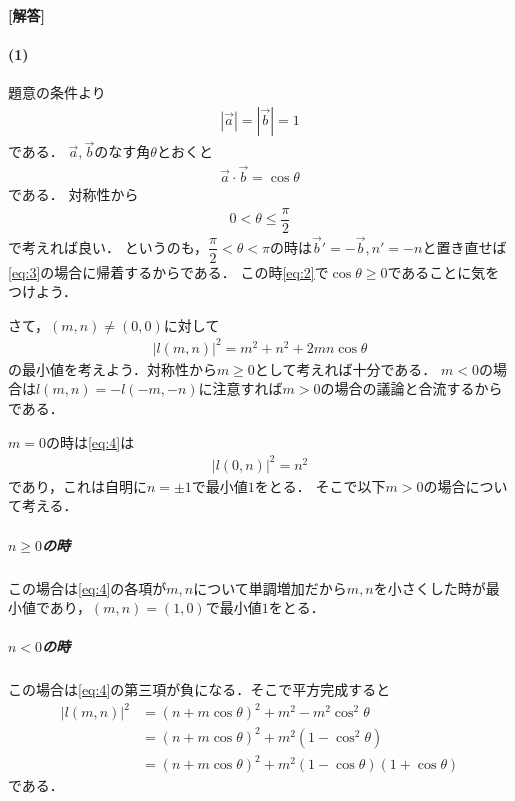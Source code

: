 \documentclass[../../main.tex]{subfiles}
\begin{document}
\begin{oframed}
  
\end{oframed}

{\bf [解答]}

\paragraph{(1)}

題意の条件より
\begin{align}
  |\vec a| = |\vec b| = 1 \label{eq:1}
\end{align}
である．
$\vec a,\vec b$のなす角$\theta$とおくと
\begin{align}
  \vec{a}\cdot\vec{b} = \cos\theta \label{eq:2}
\end{align}
である．
対称性から
\begin{align}
  0<\theta\le\dfrac{\pi}{2} \label{eq:3}
\end{align}
で考えれば良い．
というのも，$\dfrac{\pi}{2}<\theta<\pi$の時は$\vec{b}'=-\vec{b},n'=-n$と置き直せば\cref{eq:3}の場合に帰着するからである．
この時\cref{eq:2}で$\cos\theta \ge 0$であることに気をつけよう．

さて，$(m,n)\neq (0,0)$に対して
\begin{align}
  |l(m,n)|^2=m^2+n^2+2mn\cos\theta  \label{eq:4}
\end{align}
の最小値を考えよう．対称性から$m \ge 0$として考えれば十分である．
$m<0$の場合は$l(m,n)=-l(-m,-n)$に注意すれば$m>0$の場合の議論と合流するからである．

$m=0$の時は\cref{eq:4}は
\begin{align}
  |l(0,n)|^2=n^2 \label{eq:5}
\end{align}
であり，これは自明に$n= \pm 1$で最小値$1$をとる．
そこで以下$m>0$の場合について考える．

\subparagraph{$n\ge 0$の時}

この場合は\cref{eq:4}の各項が$m,n$について単調増加だから$m,n$を小さくした時が最小値であり，$(m,n)=(1,0)$で最小値$1$をとる．

\subparagraph{$n<0$の時}

この場合は\cref{eq:4}の第三項が負になる．そこで平方完成すると
\begin{align}
  |l(m,n)|^2
  &=\left(n+m\cos\theta\right)^2 + m^2 - m^2\cos^2\theta \\
  &=\left(n+m\cos\theta\right)^2 + m^2\left(1-\cos^2\theta\right) \\
  &=\left(n+m\cos\theta\right)^2 + m^2\left(1-\cos\theta\right)\left(1+\cos\theta\right) \label{eq:6}
\end{align}
である．
\end{document}
